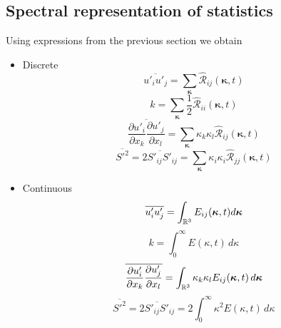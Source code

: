 \documentclass[oneside,a4paper,11pt]{report}
\newcommand{\ufluc}{u'}
\newcommand{\Sfluc}{S'}
\newcommand{\tpvc}{\mathcal{R}} %
\newcommand{\est}{E}            %
\newcommand{\kappavec}{\boldsymbol{\kappa}}
\begin{document}
\subsection{Spectral representation of statistics}
Using expressions from the previous section we obtain
\begin{itemize}
\item Discrete
\begin{equation}
    \overline{ \ufluc_i \ufluc_j } = \sum_{\kappavec} \hat{\tpvc}_{ij}(\kappavec,t)
\end{equation} 
\begin{equation}
    \label{eq:discrete_k_spectral}
    k = \sum_{\kappavec} \frac{1}{2} \hat{\tpvc}_{ii}(\kappavec,t) 
\end{equation}
\begin{equation}
    \overline{ \frac{ \partial \ufluc_i }{ \partial x_k} \frac{ \partial \ufluc_j }{ \partial x_l } } = \sum_{\kappavec} \kappa_k \kappa_l \hat{\tpvc}_{ij}(\kappavec,t)
\end{equation}
\begin{equation}
    \overline{ \Sfluc^2 } = \overline{ 2 \Sfluc_{ij} \Sfluc_{ij} } = \sum_{\kappavec} \kappa_i \kappa_i \hat{\tpvc}_{jj}(\kappavec,t)
\end{equation}

\item Continuous
\begin{equation}
    \label{eq:continuous_uiuj_spectral}
    \overline{ \ufluc_i \ufluc_j } = \int_\Rthree E_{ij}(\kappavec,t) d\kappavec
\end{equation} 
\begin{equation}
    k =\int_0^\infty \est(\kappa,t) \, d\kappa
\end{equation}
\begin{equation}
    \overline{ \frac{ \partial \ufluc_i }{ \partial x_k} \frac{ \partial \ufluc_j }{ \partial x_l } } = \int_{\Rthree} \kappa_k \kappa_l \est_{ij}(\kappavec,t) \, d\kappavec
\end{equation}
\begin{equation}
    \label{eq:strain_mag_spectral}
    \overline{ \Sfluc^2 } = \overline{ 2 \Sfluc_{ij} \Sfluc_{ij} } = 2 \int_{0}^\infty \kappa^2 \est(\kappa,t) \, d\kappa
\end{equation}
\end{itemize}

\end{document}
